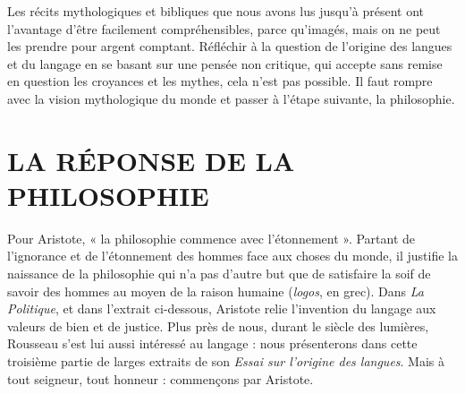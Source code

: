 Les récits mythologiques et bibliques que nous avons lus jusqu’à présent ont l’avantage d’être facilement compréhensibles, parce qu’imagés, mais on ne peut les prendre pour argent comptant. Réfléchir à la question de l’origine des langues et du langage en se basant sur une pensée non critique, qui accepte sans remise en question les croyances et les mythes, cela n’est pas possible. Il faut rompre avec la vision mythologique du monde et passer à l’étape suivante, la philosophie.
\section{LA RÉPONSE DE LA PHILOSOPHIE}
Pour Aristote, « la philosophie commence avec l’étonnement ». Partant de l’ignorance et de l’étonnement des hommes face aux choses du monde, il justifie la naissance de la philosophie qui n’a pas d’autre but que de satisfaire la soif de savoir des hommes au moyen de la raison humaine (\textit{logos}, en grec). Dans \textit{La Politique}, et dans l’extrait ci-dessous, Aristote relie l’invention du langage aux valeurs de bien et de justice. Plus près de nous, durant le siècle des lumières, Rousseau s’est lui aussi intéressé au langage : nous présenterons dans cette troisième partie de larges extraits de son \textit{Essai sur l’origine des langues}. Mais à tout seigneur, tout honneur : commençons par Aristote.
